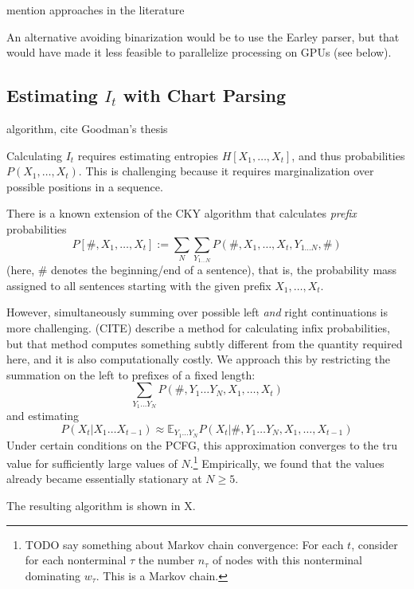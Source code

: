 \documentclass[11pt,letterpaper]{article}
\newcommand{\E}[0]{\mathbb{E}}
\begin{document}
mention approaches in the literature

An alternative avoiding binarization would be to use the Earley parser, but that would have made it less feasible to parallelize processing on GPUs (see below).

\subsection{Estimating $I_t$ with Chart Parsing}
algorithm, cite Goodman's thesis

Calculating $I_t$ requires estimating entropies $H[X_1, \dots, X_t]$, and thus probabilities $P(X_1, \dots, X_t)$.
This is challenging because it requires marginalization over possible positions in a sequence.

There is a known extension of the CKY algorithm that calculates \emph{prefix} probabilities
\begin{equation}
P[\#, X_1, \dots, X_t] := \sum_N \sum_{Y_{1\dots N}} P(\#, X_1, \dots, X_t, Y_{1\dots N}, \#)
\end{equation}
(here, $\#$ denotes the beginning/end of a sentence), that is, the probability mass assigned to all sentences starting with the given prefix $X_1, \dots, X_t$.

However, simultaneously summing over possible left \emph{and} right continuations is more challenging.
(CITE) describe a method for calculating infix probabilities, but that method computes something subtly different from the quantity required here, and it is also computationally costly.
We approach this by restricting the summation on the left to prefixes of a fixed length:
\begin{equation}
    \sum_{Y_1\dots Y_N} P(\#, Y_1 \dots Y_N, X_1, \dots, X_t)
\end{equation}
and estimating
\begin{equation}
    P(X_t|X_1\dots X_{t-1}) \approx \E_{Y_1\dots Y_N} P(X_t|\#, Y_1 \dots Y_N, X_1, \dots, X_{t-1})
\end{equation}
Under certain conditions on the PCFG, this approximation converges to the tru value for sufficiently large values of $N$.\footnote{TODO say something about Markov chain convergence: For each $t$, consider for each nonterminal $\tau$ the number $n_\tau$ of nodes with this nonterminal dominating $w_\tau$. This is a Markov chain.}
Empirically, we found that the values already became essentially stationary at $N\geq 5$.

The resulting algorithm is shown in X.
\end{document}
